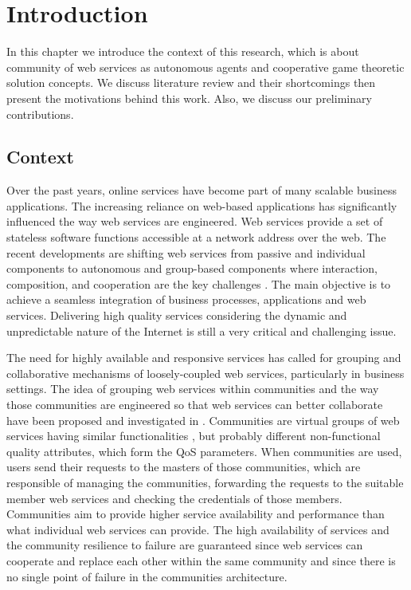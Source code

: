 \setcounter{chapter}{0}
\chapter{Introduction}\label{sec:intro}
In this chapter we introduce the context of this research, which is about community of web services as autonomous agents and cooperative game theoretic solution concepts. We discuss literature review and their shortcomings then present the motivations behind this work. Also, we discuss our preliminary contributions.

\section{Context}\label{sec:motivation}

Over the past years, online services have become part of many
scalable business applications. The increasing reliance on
web-based applications has significantly influenced the way web
services are engineered. Web services provide a set of stateless
software functions accessible at a network address over the web.
The recent developments are shifting web services from passive and
individual components to autonomous and group-based components
where interaction, composition, and cooperation are the key
challenges \cite{ICWS2011-1,SCC2011-1}. The main objective is to
achieve a seamless integration of business processes, applications
and web services. Delivering high quality services considering the
dynamic and unpredictable nature of the Internet is still a very
critical and challenging issue.

The need for highly available and responsive services has called
for grouping and collaborative mechanisms of loosely-coupled web
services, particularly in business settings. The idea of grouping
web services within communities and the way those communities are
engineered so that web services can better collaborate have been
proposed and investigated in
\cite{DBLP:journals/ijebr/MaamarSTBB09,DBLP:journals/internet/BenatallahSD03,Rosario:2008:PQS:1512146.1512290}.
Communities are virtual groups of web services having similar
functionalities \cite{Zeng:2003:QDW:775152.775211, Paik:2005:TSS:2229263.2230038,Medjahed05adynamic,10.1109/ARES.2008.7}, but probably different non-functional quality
attributes, which form the QoS parameters. When communities are
used, users send their requests to the masters of those
communities, which are responsible of managing the communities,
forwarding the requests to the suitable member web services and
checking the credentials of those members. Communities aim to
provide higher service availability and performance than what
individual web services can provide. The high availability of
services and the community resilience to failure are guaranteed
since web services can cooperate and replace each other within the
same community and since there is no single point of failure in
the communities architecture.


